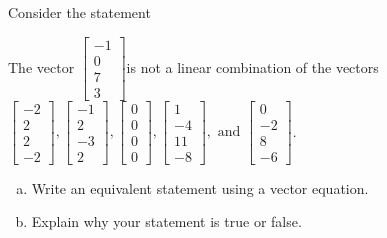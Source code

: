
\begin{exerciseStatement}


Consider the statement 
\begin{center}\begin{minipage}{0.8\textwidth}
 The vector \( \left[\begin{array}{c}
-1 \\
0 \\
7 \\
3
\end{array}\right] \)is not a linear combination of the vectors \( \left[\begin{array}{c}
-2 \\
2 \\
2 \\
-2
\end{array}\right] , \left[\begin{array}{c}
-1 \\
2 \\
-3 \\
2
\end{array}\right] , \left[\begin{array}{c}
0 \\
0 \\
0 \\
0
\end{array}\right] , \left[\begin{array}{c}
1 \\
-4 \\
11 \\
-8
\end{array}\right] , \text{ and } \left[\begin{array}{c}
0 \\
-2 \\
8 \\
-6
\end{array}\right] \). 
\end{minipage}\end{center}
    


\begin{enumerate}[(a)]
\item  Write an equivalent statement using a vector equation.
\item  Explain why your statement is true or false.
\end{enumerate}
    
\end{exerciseStatement}
    

